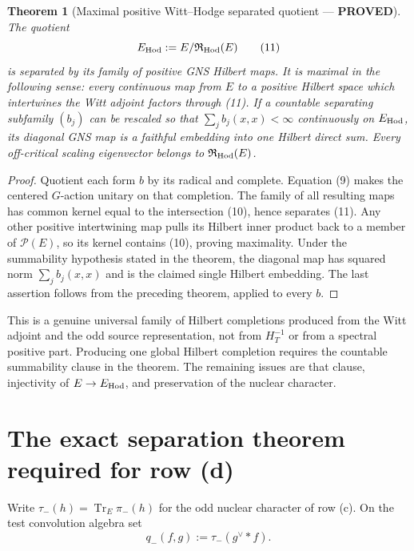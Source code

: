 \documentclass[11pt]{article}
\newcommand{\PROVED}{\textcolor{green!40!black}{\textbf{PROVED}}}
\newtheorem{theorem}{Theorem}
\begin{document}
\begin{theorem}[Maximal positive Witt--Hodge separated quotient --- \PROVED]
The quotient
\begin{equation}
                 E_{\rm Hod}:=E/\mathfrak R_{\rm Hod}(E)       \tag{11}
\end{equation}
is separated by its family of positive GNS Hilbert maps.  It is maximal in
the following sense: every continuous map from $E$ to a positive Hilbert
space which intertwines the Witt adjoint factors through (11).  If a
countable separating subfamily $(b_j)$ can be rescaled so that
$\sum_j b_j(x,x)<\infty$ continuously on $E_{\rm Hod}$, its diagonal GNS
map is a faithful embedding into one Hilbert direct sum.  Every
off-critical scaling eigenvector belongs to
$\mathfrak R_{\rm Hod}(E)$.
\end{theorem}

\begin{proof}
Quotient each form $b$ by its radical and complete.  Equation (9) makes
the centered $G$-action unitary on that completion.  The family of all
resulting maps has common kernel equal to the intersection (10), hence
separates (11).  Any other positive intertwining map pulls its Hilbert
inner product back to a member of $\mathscr P(E)$, so its kernel contains
(10), proving maximality.  Under the summability hypothesis stated in the
theorem, the diagonal map has squared norm $\sum_jb_j(x,x)$ and is the
claimed single Hilbert embedding.  The last assertion follows from the
preceding theorem, applied to every $b$.
\end{proof}

This is a genuine universal family of Hilbert completions produced from the
Witt adjoint and the odd source representation, not from $H_T^{-1}$ or from
a spectral positive part.  Producing one global Hilbert completion requires
the countable summability clause in the theorem.  The remaining issues are
that clause, injectivity of $E\to E_{\rm Hod}$, and preservation of the
nuclear character.

\section{The exact separation theorem required for row (d)}

Write $\tau_-(h)=\operatorname{Tr}_E\pi_-(h)$ for the odd nuclear character
of row (c).  On the test convolution algebra set
\begin{equation}
              q_-(f,g):=\tau_-(g^\vee*f).            \tag{12}
\end{equation}
\end{document}
